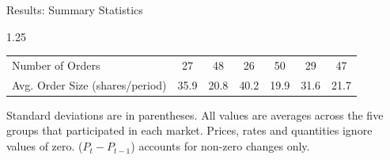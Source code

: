 \documentclass[10pt]{beamer}
\begin{document}
\begin{frame}{Results: Summary Statistics}
\begin{table}[H]
{\begin{threeparttable}
\begin{spacing}{1.25}
\begin{tabular}{lcccccc}
                 Number of Orders     & 27            & 48            & 26             & 50         & 29       & 47      \\
                 Avg. Order Size (shares/period)                 & 35.9          & 20.8          & 40.2            & 19.9       & 31.6       & 21.7   \\
                \hline
                \hline
            \end{tabular}
            \end{spacing}
            \vspace{.5em}
            \begin{tablenotes}\noindent\justifying\scriptsize Standard deviations are in parentheses. All values are averages across the five groups that participated in each market. Prices, rates and quantities ignore values of zero. ($P_{t} - P_{t - 1}$) accounts for non-zero changes only. \end{tablenotes}
        \end{threeparttable}}
    \end{table}
\end{frame}
\end{document}

